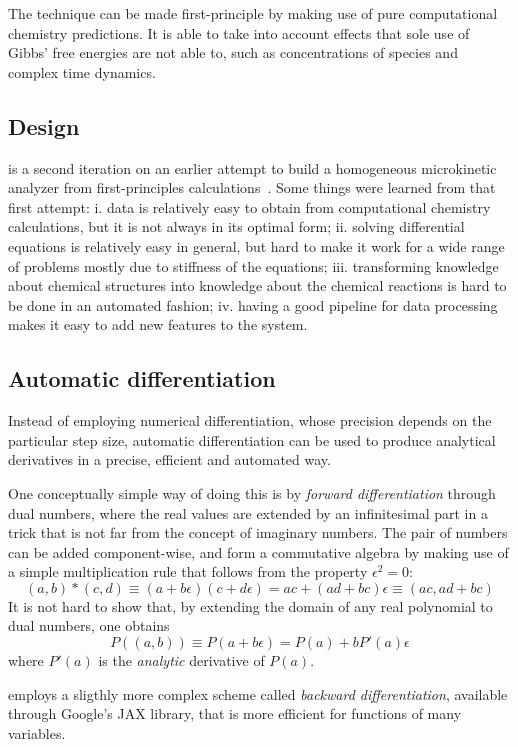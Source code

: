 The technique can be made first-principle by making use of pure computational
chemistry predictions.
It is able to take into account effects that sole use of Gibbs' free energies
are not able to, such as concentrations of species and complex time dynamics.



\subsection{Design}

\overreact is a second iteration on an earlier attempt to build a
homogeneous microkinetic analyzer from first-principles
calculations~\cite{pyrrole2019zenodo}.
Some things were learned from that first attempt:
i. data is relatively easy to obtain from computational chemistry calculations,
but it is not always in its optimal form;
ii. solving differential equations is relatively easy in general, but hard to
make it work for a wide range of problems mostly due to stiffness of the
equations;
iii. transforming knowledge about chemical structures into knowledge about the
chemical reactions is hard to be done in an automated fashion;
iv. having a good pipeline for data processing makes it easy to add new
features to the system.

\subsection{Automatic differentiation}

Instead of employing numerical differentiation, whose precision depends on the
particular step size, automatic differentiation can be used to produce
analytical derivatives in a precise, efficient and automated way.

One conceptually simple way of doing this is by \emph{forward differentiation}
through dual numbers, where the real values are extended by an infinitesimal
part in a trick that is not far from the concept of imaginary numbers.
The pair of numbers can be added component-wise, and form a commutative algebra
by making use of a simple multiplication rule that follows from the property
$\epsilon^2 = 0$:
\begin{equation}
    (a, b) * (c, d)
    \equiv (a + b\epsilon)(c + d\epsilon)
    = a c + (a d + b c)\epsilon
    \equiv (a c, a d + b c)
\end{equation}
It is not hard to show that, by extending the domain of any real polynomial to
dual numbers, one obtains
\begin{equation}
    P((a, b)) \equiv P(a + b\epsilon) = P(a) + b P'(a) \epsilon
\end{equation}
where $P'(a)$ is the \emph{analytic} derivative of $P(a)$.

\overreact employs a sligthly more complex scheme called
\emph{backward differentiation}, available through Google's JAX library, that
is more efficient for functions of many variables.
